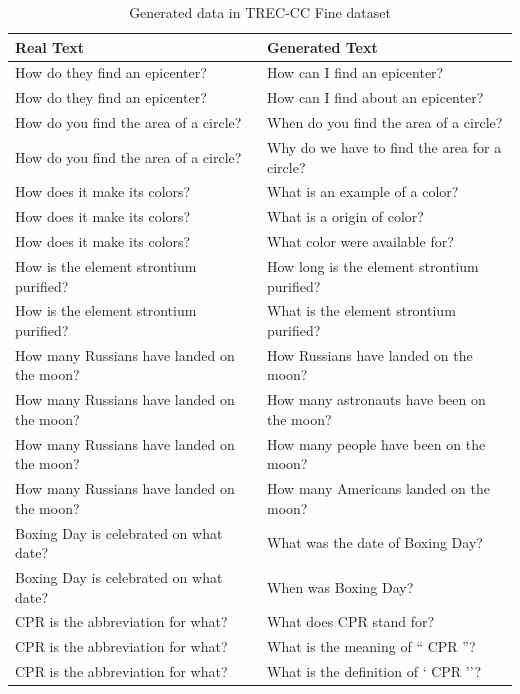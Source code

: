 \documentclass[11pt]{article}
\begin{document}
\begin{table}[!ht]
    \centering
    \begin{tabular}{p{0.5\linewidth}|p{0.5\linewidth}}
    \toprule
    \textbf{Real Text}  & \textbf{Generated Text} \\
    \midrule
How do they find an epicenter?	& How can I find an epicenter?\\
How do they find an epicenter?	& How can I find about an epicenter?\\
How do you find the area of a circle?	& When do you find the area of a circle?\\
How do you find the area of a circle?	& Why do we have to find the area for a circle?\\
How does it make its colors?	& What is an example of a color?\\
How does it make its colors?	& What is a origin of color?\\
How does it make its colors?	& What color were available for?\\
How is the element strontium purified?	& How long is the element strontium purified?\\
How is the element strontium purified?	& What is the element strontium purified?\\
How many Russians have landed on the moon?	& How Russians have landed on the moon?\\
How many Russians have landed on the moon?	& How many astronauts have been on the moon?\\
How many Russians have landed on the moon?	& How many people have been on the moon?\\
How many Russians have landed on the moon?	& How many Americans landed on the moon?\\
Boxing Day is celebrated on what date?	& What was the date of Boxing Day?\\
Boxing Day is celebrated on what date?	& When was Boxing Day?\\
CPR is the abbreviation for what?	& What does CPR stand for?\\
CPR is the abbreviation for what?	& What is the meaning of `` CPR ''?\\
CPR is the abbreviation for what?	& What is the definition of ` CPR ''?\\
\bottomrule
\end{tabular}
\caption{Generated data in TREC-CC Fine dataset}
\label{table:generated_data}
\end{table}
\end{document}
